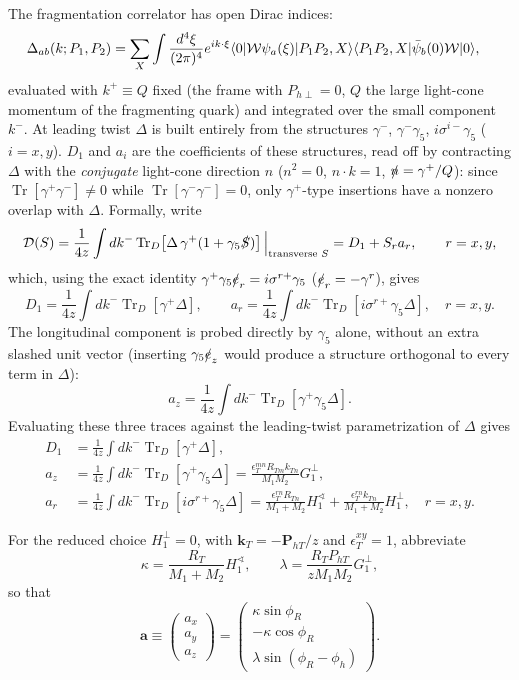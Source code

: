 \documentclass[10pt]{article}
\newcommand{\Tr}{\operatorname{Tr}}
\begin{document}
The fragmentation correlator has open Dirac indices:
\begin{align*}
\Delta_{ab}(k;P_1,P_2)=\sum_X\int\frac{d^4\xi}{(2\pi)^4}e^{ik\cdot\xi}
&\langle0|{\cal W}\psi_a(\xi)|P_1P_2,X\rangle
\langle P_1P_2,X|\bar\psi_b(0){\cal W}|0\rangle ,
\end{align*}
evaluated with \(k^+\equiv Q\) fixed (the frame with \(P_{h\perp}=0\),
\(Q\) the large light-cone momentum of the fragmenting quark) and
integrated over the small component \(k^-\).  At leading twist \(\Delta\)
is built entirely from the structures \(\gamma^-\), \(\gamma^-\gamma_5\),
\(i\sigma^{i-}\gamma_5\) (\(i=x,y\)).  \(D_1\) and \(a_i\) are the
coefficients of these structures, read off by contracting \(\Delta\) with
the \emph{conjugate} light-cone direction \(n\) (\(n^2=0\), \(n\cdot k=1\),
\(\slashed n=\gamma^+/Q\)): since \(\Tr[\gamma^+\gamma^-]\neq0\) while
\(\Tr[\gamma^-\gamma^-]=0\), only \(\gamma^+\)-type insertions have a
nonzero overlap with \(\Delta\).  Formally, write
\[
{\cal D}(S)=\frac1{4z}\int dk^-\Tr_D\!\left[\Delta\,\gamma^+(1+\gamma_5\slashed S)\right]
\Big|_{\text{transverse }S}
=D_1+S_ra_r ,
\qquad r=x,y ,
\]
which, using the exact identity \(\gamma^+\gamma_5\slashed e_r=i\sigma^{r+}\gamma_5\)
(\(\slashed e_r=-\gamma^r\)), gives
\[
D_1=\frac1{4z}\int dk^-\Tr_D[\gamma^+\Delta],
\qquad
a_r=\frac1{4z}\int dk^-\Tr_D[i\sigma^{r+}\gamma_5\Delta],
\quad r=x,y .
\]
The longitudinal component is probed directly by \(\gamma_5\) alone,
without an extra slashed unit vector (inserting \(\gamma_5\slashed e_z\)
would produce a structure orthogonal to every term in \(\Delta\)):
\[
a_z=\frac1{4z}\int dk^-\Tr_D[\gamma^+\gamma_5\Delta] .
\]
Evaluating these three traces against the leading-twist parametrization
of \(\Delta\) gives
\begin{align*}
D_1&=\frac1{4z}\int dk^-\Tr_D[\gamma^+\Delta],
\\
a_z&=\frac1{4z}\int dk^-\Tr_D[\gamma^+\gamma_5\Delta]
=\frac{\epsilon_T^{mn}R_{Tm}k_{Tn}}{M_1M_2}G_1^\perp,
\\
a_r&=\frac1{4z}\int dk^-\Tr_D[i\sigma^{r+}\gamma_5\Delta]
=\frac{\epsilon_T^{rn}R_{Tn}}{M_1+M_2}H_1^{\sphericalangle}
+\frac{\epsilon_T^{rn}k_{Tn}}{M_1+M_2}H_1^\perp,
\quad r=x,y .
\end{align*}

For the reduced choice \(H_1^\perp=0\), with
\(\boldsymbol k_T=-\boldsymbol P_{hT}/z\) and
\(\epsilon_T^{xy}=1\), abbreviate
\[
\kappa=\frac{R_T}{M_1+M_2}H_1^{\sphericalangle},
\qquad
\lambda=\frac{R_TP_{hT}}{zM_1M_2}G_1^\perp,
\]
so that
\[
\mathbf a\equiv\begin{pmatrix}a_x\\a_y\\a_z\end{pmatrix}
=\begin{pmatrix}\kappa\sin\phi_R\\-\kappa\cos\phi_R\\
\lambda\sin(\phi_R-\phi_h)\end{pmatrix} .
\]
\end{document}

